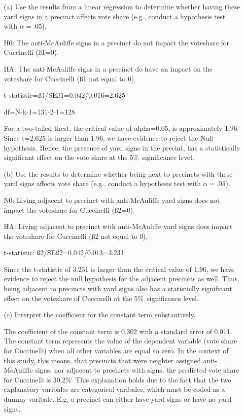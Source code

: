 \documentclass[12pt,letterpaper]{article}
\begin{document}
\vspace{.5cm}
\begin{enumerate}
	\item [(a)] Use the results from a linear regression to determine whether having these yard signs in a precinct affects vote share (e.g., conduct a hypothesis test with $\alpha = .05$).

H0: The anti-McAuliffe signs in a precinct do not impact the voteshare for Cuccinelli (ß1=0).


HA: The anti-McAuliffe signs in a precinct do have an impact on the voteshare for Cuccinelli (ß1 not equal to 0).


t-statistic=ß1/SEß1=0.042/0.016=2.625

df=N-k-1=131-2-1=128

For a two-tailed thest, the critical value of alpha=0.05, is approximately 1.96. Since t=2.625 is larger than 1.96, we have evidence to reject the Null hypothesis. Hence, the presence of yard signs in the precint, has a statistically significant effect on the vote share at the 5\%\ significance level. 


	
	\newpage		
	\item [(b)]  Use the results to determine whether being
	next to precincts with these yard signs affects vote
	share (e.g., conduct a hypothesis test with $\alpha = .05$).

N0: Living adjacent to precinct with anti-McAuliffe yard signs does not impact the voteshare for Cuccinelli (ß2=0).

HA: Living adjacent to precinct with anti-McAuliffe yard signs does impact the voteshare for Cuccinelli (ß2 not equal to 0).

t-statistic: ß2/SEß2=0.042/0.013=3.231

Since the t-statistic of 3.231 is larger than the critical value of 1.96, we have evidence to reject the null hypothesis for the adjacent precincts as well. Thus, being adjacent to precincts with yard signs also has a statisticlly significant effect on the voteshare of Cuccinelli at the 5\%\ significance level. 
	
	\vspace{7cm}
	\item [(c)] Interpret the coefficient for the constant term substantively.

The coefficient of the constant term is 0.302 with a standard error of 0.011. The constant term represents the value of the dependent variable (vote share for Cuccinelli) when all other variables are equal to zero. In the context of this study, this means, that precincts that were neighter assigned anti-McAuliffe signs, nor adjacent to precincts with signs, the predicted vote share for Cuccinelli is 30.2\%\..  This explanation holds due to the fact that the two explanatory varibales are categorical varibales, which must be coded as a dummy varibale. E.g. a precinct can either have yard signs or have no yard signs. 
	\vspace{7cm}
	

\end{enumerate}
\end{document}
